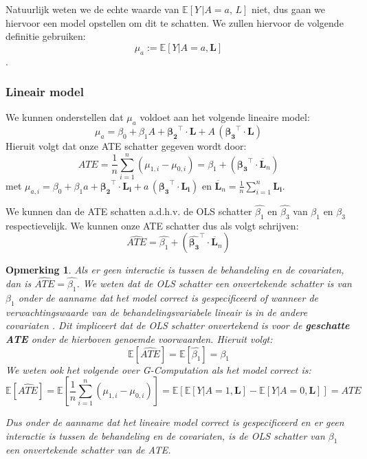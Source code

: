 \documentclass[12pt, a4paper, faculty=we]{ugent-doc}
\newcommand{\E}[1]{\mathds{E}[#1]}
\newtheorem*{remark}{Opmerking}
\begin{document}
\begin{flushleft}
    Natuurlijk weten we de echte waarde van $\E{Y \, | A=a, \, L}$ niet, dus gaan we hiervoor een model opstellen om dit te schatten.
    We zullen hiervoor de volgende definitie gebruiken: $$\mu_a := \E{Y | A = a, \mathbf{L}}$$. 

    \subsubsection{Lineair model}
    We kunnen onderstellen dat \(\mu_a\) voldoet aan het volgende lineaire model:
    \[
{\mu}_a = \beta_0 + \beta_1 A + \mathbf{\beta_2}^{\top} \cdot \mathbf{L} + A \, (\mathbf{\beta_3}^{\top} \cdot \mathbf{L})    \]
    Hieruit volgt dat onze ATE schatter gegeven wordt door:
    \begin{equation}
        ATE = \frac{1}{n} \sum_{i=1}^{n} \left( \mu_{1,i} - \mu_{0,i} \right) = \beta_1 + (\mathbf{\beta_3}^{\top} \cdot \mathbf{\overline{L}}_n)
    \end{equation}
    met \(\mu_{a,i} = \beta_0 + \beta_1 a + \mathbf{\beta_2}^{\top} \cdot \mathbf{L_i} + a \, (\mathbf{\beta_3}^{\top} \cdot \mathbf{L_i})\) en \(\mathbf{\overline{L}}_n = \frac{1}{n} \sum_{i=1}^{n} \mathbf{L_i}\).

    
\end{flushleft}

\begin{flushleft}
    We kunnen dan de ATE schatten a.d.h.v. de OLS schatter \(\hat{\beta_1}\) en \(\hat{\beta_3}\) van \(\beta_1\) en \(\beta_3\) respectievelijk.
     We kunnen onze ATE schatter dus als volgt schrijven:
        \[\hat{ATE} = \hat{\beta_1} + (\hat{\mathbf{\beta_3}}^{\top} \cdot \mathbf{\overline{L}}_n)\]
    \begin{remark}
    Als er geen interactie is tussen de behandeling en de covariaten, dan is \(\hat{ATE} = \hat{\beta_1}\).
    We weten dat de OLS schatter een onvertekende schatter is van \(\beta_1\) onder de aanname dat het model correct is gespecificeerd of wanneer de 
    verwachtingswaarde van de behandelingsvariabele lineair is in de andere covariaten .
    Dit impliceert dat de OLS schatter onvertekend is voor de \textbf{geschatte ATE} onder de hierboven genoemde voorwaarden. 
    Hieruit volgt:
    \[
        \E{\hat{ATE}} = \E{\hat{\beta_1}} = \beta_1
    \]
    We weten ook het volgende over G-Computation als het model correct is:
    \[
        \E{\hat{ATE}} = \E{\frac{1}{n} \sum_{i=1}^{n} \left( \mu_{1,i} - \mu_{0,i} \right)} = \E{\E{Y | A = 1, \mathbf{L}} - \E{Y | A = 0, \mathbf{L}}} = ATE \]

    Dus onder de aanname dat het lineaire model correct is gespecificeerd en er geen interactie is tussen de behandeling en de covariaten, is de OLS schatter van \(\beta_1\) een onvertekende schatter van de ATE.
    \end{remark}
\end{flushleft}
\end{document}
